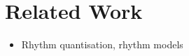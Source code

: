 \section{Related Work}
\label{sec:relatedwork}

\begin{itemize}
\item Rhythm quantisation, rhythm models
\end{itemize}
